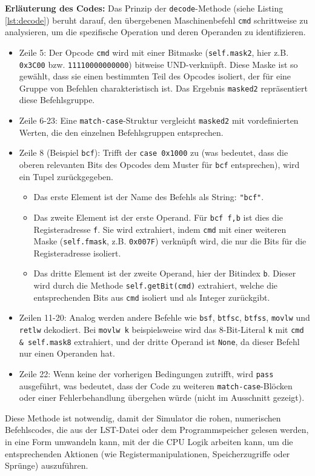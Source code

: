 \textbf{Erläuterung des Codes:}
Das Prinzip der \texttt{decode}-Methode (siehe Listing \ref{lst:decode}) beruht darauf, den übergebenen Maschinenbefehl \texttt{cmd} schrittweise zu analysieren, um die spezifische Operation und deren Operanden zu identifizieren.
\begin{itemize}
    \item Zeile 5: Der Opcode \texttt{cmd} wird mit einer Bitmaske (\texttt{self.mask2}, hier z.B. \texttt{0x3C00} bzw. \texttt{11110000000000}) bitweise UND-verknüpft. Diese Maske ist so gewählt, dass sie einen bestimmten Teil des Opcodes isoliert, der für eine Gruppe von Befehlen charakteristisch ist. Das Ergebnis \texttt{masked2} repräsentiert diese Befehlsgruppe.
    \item Zeile 6-23: Eine \texttt{match-case}-Struktur vergleicht \texttt{masked2} mit vordefinierten Werten, die den einzelnen Befehlsgruppen entsprechen.
    \item Zeile 8 (Beispiel \texttt{bcf}): Trifft der \texttt{case 0x1000} zu (was bedeutet, dass die oberen relevanten Bits des Opcodes dem Muster für \texttt{bcf} entsprechen), wird ein Tupel zurückgegeben.
    \begin{itemize}
        \item Das erste Element ist der Name des Befehls als String: \texttt{"bcf"}.
        \item Das zweite Element ist der erste Operand. Für \texttt{bcf f,b} ist dies die Registeradresse \texttt{f}. Sie wird extrahiert, indem \texttt{cmd} mit einer weiteren Maske (\texttt{self.fmask}, z.B. \texttt{0x007F}) verknüpft wird, die nur die Bits für die Registeradresse isoliert.
        \item Das dritte Element ist der zweite Operand, hier der Bitindex \texttt{b}. Dieser wird durch die Methode \texttt{self.getBit(cmd)} extrahiert, welche die entsprechenden Bits aus \texttt{cmd} isoliert und als Integer zurückgibt.
    \end{itemize}
    \item Zeilen 11-20: Analog werden andere Befehle wie \texttt{bsf}, \texttt{btfsc}, \texttt{btfss}, \texttt{movlw} und \texttt{retlw} dekodiert. Bei \texttt{movlw k} beispielsweise wird das 8-Bit-Literal \texttt{k} mit \texttt{cmd \& self.mask8} extrahiert, und der dritte Operand ist \texttt{None}, da dieser Befehl nur einen Operanden hat.
    \item Zeile 22: Wenn keine der vorherigen Bedingungen zutrifft, wird \texttt{pass} ausgeführt, was bedeutet, dass der Code zu weiteren \texttt{match-case}-Blöcken oder einer Fehlerbehandlung übergehen würde (nicht im Ausschnitt gezeigt).
\end{itemize}
Diese Methode ist notwendig, damit der Simulator die rohen, numerischen Befehlscodes, die aus der LST-Datei oder dem Programmspeicher gelesen werden, in eine Form umwandeln kann, mit der die \ac{CPU} Logik arbeiten kann, um die entsprechenden Aktionen (wie Registermanipulationen, Speicherzugriffe oder Sprünge) auszuführen.

